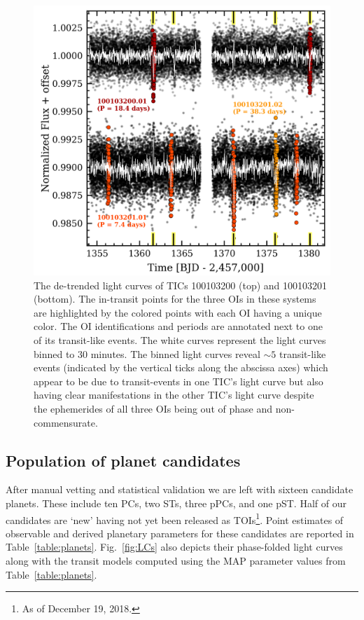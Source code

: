 \begin{figure}
  \centering
  \includegraphics[width=0.8\hsize]{figures/TIC300_LC.png}
  \caption[Example of scattered light within the common aperture of nearby TICs.]
      {The de-trended light curves of TICs 100103200 (top) and 100103201 (bottom).
    The in-transit points for the three
    OIs in these systems are highlighted by the colored points with each OI having a unique color.
    The OI identifications and periods are annotated next to one of its transit-like events.
    The white curves represent the light curves binned to 30 minutes. The binned light curves reveal
    $\sim 5$ transit-like events (indicated by the vertical ticks along the abscissa axes) which appear to be
    due to transit-events in one TIC's light curve but also having clear manifestations in the other
    TIC's light curve despite the ephemerides of all three OIs being out of phase and non-commensurate.}
  \label{fig:tic300}
\end{figure}

\subsection{Population of planet candidates}
After manual vetting and statistical validation we are left with sixteen candidate planets. These include
ten PCs, two STs, three pPCs, and one pST. Half of our candidates are `new' having not yet been released
as TOIs\footnote{As of December 19, 2018.}.
Point estimates of observable and derived planetary parameters for these candidates are reported in
Table~\ref{table:planets}.  Fig.~\ref{fig:LCs} also depicts their phase-folded light curves along with
the transit models computed using the MAP parameter values from Table~\ref{table:planets}.

